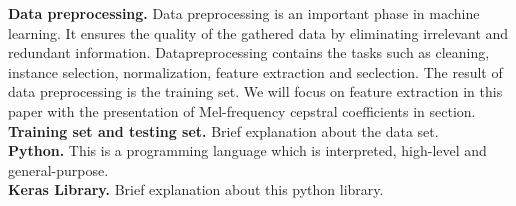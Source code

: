 \textbf{Data preprocessing.} Data preprocessing is an important phase in machine
learning. It ensures the quality of the gathered data by eliminating irrelevant
and redundant information. Datapreprocessing contains the tasks such as
cleaning, instance selection, normalization, feature extraction and seclection.
The result of data preprocessing is the training set. We will focus on feature
extraction in this paper with the presentation of Mel-frequency cepstral
coefficients in section.\\


\textbf{Training set and testing set.} Brief explanation about the data set.\\

\textbf{Python.} This is a programming language which is interpreted, high-level
and general-purpose.~\cite{Python}\\

\textbf{Keras Library.} Brief explanation about this python library.\\
